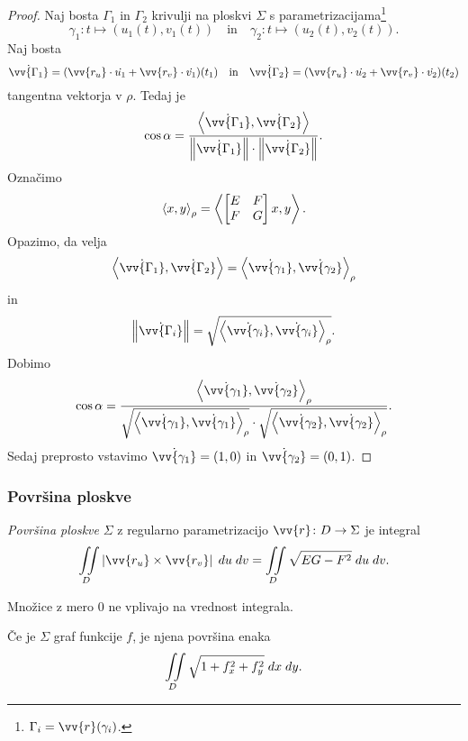 
\begin{proof}
Naj bosta $\Gamma_1$ in $\Gamma_2$ krivulji na ploskvi $\Sigma$ s
parametrizacijama\footnote{$\Gamma_i = \vv{r}(\gamma_i)$.}
\[
\gamma_1 \colon t \mapsto (u_1(t), v_1(t))
\quad \text{in} \quad
\gamma_2 \colon t \mapsto (u_2(t), v_2(t)).
\]
Naj bosta
\[
\dot{\vv{\Gamma_1}} =
(\vv{r_u} \cdot \dot{u_1} + \vv{r_v} \cdot \dot{v_1})(t_1)
\quad \text{in} \quad
\dot{\vv{\Gamma_2}} =
(\vv{r_u} \cdot \dot{u_2} + \vv{r_v} \cdot \dot{v_2})(t_2)
\]
tangentna vektorja v $\rho$. Tedaj je
\[
\cos \alpha = \frac{\skl{\dot{\vv{\Gamma_1}}, \dot{\vv{\Gamma_2}}}}{\norm{\dot{\vv{\Gamma_1}}} \cdot \norm{\dot{\vv{\Gamma_2}}}}.
\]
Označimo
\[
\left\langle x,y\right\rangle_\rho = \left\langle 
\begin{bmatrix}
E & F \\
F & G
\end{bmatrix}
x, y\right\rangle.
\]
Opazimo, da velja
\[
\skl{\dot{\vv{\Gamma_1}}, \dot{\vv{\Gamma_2}}} =
\skl{\dot{\vv{\gamma_1}}, \dot{\vv{\gamma_2}}}_\rho
\]
in
\[
\norm{\dot{\vv{\Gamma_i}}} =
\sqrt{\skl{\dot{\vv{\gamma_i}}, \dot{\vv{\gamma_i}}}_\rho}.
\]
Dobimo
\[
\cos \alpha =
\frac{\skl{\dot{\vv{\gamma_1}}, \dot{\vv{\gamma_2}}}_\rho}
{\sqrt{\skl{\dot{\vv{\gamma_1}}, \dot{\vv{\gamma_1}}}_\rho}
\cdot
\sqrt{\skl{\dot{\vv{\gamma_2}}, \dot{\vv{\gamma_2}}}_\rho}}.
\]
Sedaj preprosto vstavimo $\dot{\vv{\gamma_1}} = (1,0)$ in
$\dot{\vv{\gamma_2}} = (0,1)$.
\end{proof}

\subsubsection{Površina ploskve}

\begin{definicija}
\emph{Površina ploskve} $\Sigma$ z
regularno parametrizacijo $\vv{r} \colon D \to \Sigma$ je integral
\[
\liint_D \abs{\vv{r_u} \times \vv{r_v}}\;du\;dv =
\liint_D \sqrt{EG - F^2}\;du\;dv.
\]
\end{definicija}

\begin{opomba}
Množice z mero $0$ ne vplivajo na vrednost integrala.
\end{opomba}

\begin{posledica}
Če je $\Sigma$ graf funkcije $f$, je njena površina enaka
\[
\iint\limits_D \sqrt{1 + f_x^2 + f_y^2}\;dx\;dy.
\]
\end{posledica}

